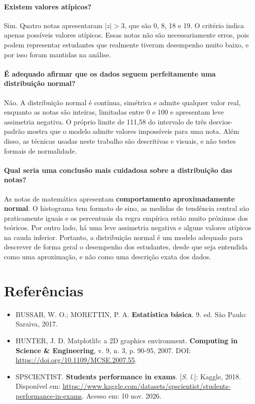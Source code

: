 \documentclass[12pt,a4paper]{article}
\begin{document}
\paragraph{Existem valores atípicos?}
Sim. Quatro notas apresentaram $|z|>3$, que são 0, 8, 18 e 19. O critério indica apenas possíveis valores atípicos. Essas notas não são necessariamente erros, pois podem representar estudantes que realmente tiveram desempenho muito baixo, e por isso foram mantidas na análise.

\paragraph{É adequado afirmar que os dados seguem perfeitamente uma distribuição normal?}
Não. A distribuição normal é contínua, simétrica e admite qualquer valor real, enquanto as notas são inteiras, limitadas entre 0 e 100 e apresentam leve assimetria negativa. O próprio limite de 111,58 do intervalo de três desvios-padrão mostra que o modelo admite valores impossíveis para uma nota. Além disso, as técnicas usadas neste trabalho são descritivas e visuais, e não testes formais de normalidade.

\paragraph{Qual seria uma conclusão mais cuidadosa sobre a distribuição das notas?}
As notas de matemática apresentam \textbf{comportamento aproximadamente normal}. O histograma tem formato de sino, as medidas de tendência central são praticamente iguais e os percentuais da regra empírica estão muito próximos dos teóricos. Por outro lado, há uma leve assimetria negativa e alguns valores atípicos na cauda inferior. Portanto, a distribuição normal é um modelo adequado para descrever de forma geral o desempenho dos estudantes, desde que seja entendida como uma aproximação, e não como uma descrição exata dos dados.

\section*{Referências}

\begin{itemize}[leftmargin=0pt,label={},itemsep=0.8em]
  \setlength{\baselineskip}{1em}
  \item BUSSAB, W. O.; MORETTIN, P. A. \textbf{Estatística básica}. 9. ed. São Paulo: Saraiva, 2017.
  \item HUNTER, J. D. Matplotlib: a 2D graphics environment. \textbf{Computing in Science \& Engineering}, v. 9, n. 3, p. 90-95, 2007. DOI: \url{https://doi.org/10.1109/MCSE.2007.55}.
  \item SPSCIENTIST. \textbf{Students performance in exams}. [\textit{S. l.}]: Kaggle, 2018. Disponível em: \url{https://www.kaggle.com/datasets/spscientist/students-performance-in-exams}. Acesso em: 10 nov. 2026.
\end{itemize}
\end{document}
